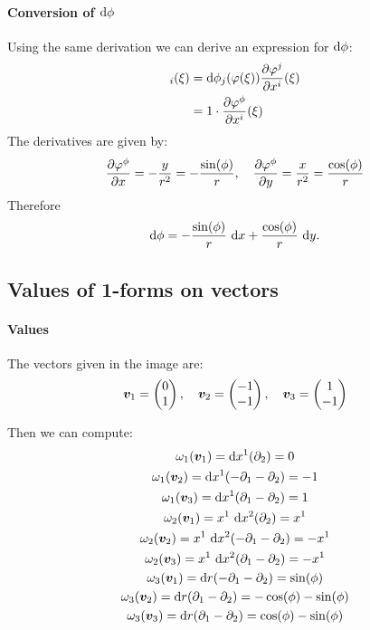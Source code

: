\documentclass[11pt, english, fleqn, DIV=15, headinclude, BCOR=1cm]{scrartcl}
\begin{document}
\paragraph{Conversion of $\mathop{}\!\mathrm d \phi$}

Using the same derivation we can derive an expression for $\mathop{}\!\mathrm d \phi$:
\begin{align*}
    [\varphi^* \dif \phi]_i(\xi)
    &= \dif \phi_j(\varphi(\xi)) \pd{\varphi^j}{x^i}(\xi) \\
    &= 1 \cdot \pd{\varphi^\phi}{x^i}(\xi)
\end{align*}
The derivatives are given by:
\[
    \frac{\partial {\varphi^\phi}}{\partial {x}} = - \frac{y}{r^2} = - \frac{\sin(\phi)}r
    ,\quad
    \frac{\partial {\varphi^\phi}}{\partial {y}} = \frac{x}{r^2} = \frac{\cos(\phi)}r
\]
Therefore
\[
    \mathop{}\!\mathrm d \phi = - \frac{\sin(\phi)}r \, \mathop{}\!\mathrm d x + \frac{\cos(\phi)}r \, \mathop{}\!\mathrm d y.
\]

\subsection{Values of 1-forms on vectors}

\paragraph{Values}

The vectors given in the image are:
\[
    \boldsymbol{v}_1 = \begin{pmatrix} 0 \\ 1 \end{pmatrix}
    ,\quad
    \boldsymbol{v}_2 = \begin{pmatrix} -1 \\ -1 \end{pmatrix}
    ,\quad
    \boldsymbol{v}_3 = \begin{pmatrix} 1 \\ -1 \end{pmatrix}
\]

Then we can compute:
\begin{gather*}
    \omega_1(\vec v_1) = \dif x^1 (\partial_2) = 0 \\
    \omega_1(\vec v_2) = \dif x^1 (-\partial_1-\partial_2) = -1 \\
    \omega_1(\vec v_3) = \dif x^1 (\partial_1-\partial_2) = 1 \\
    \omega_2(\vec v_1) = x^1 \, \dif x^2 (\partial_2) = x^1 \\
    \omega_2(\vec v_2) = x^1 \, \dif x^2 (-\partial_1-\partial_2) = -x^1 \\
    \omega_2(\vec v_3) = x^1 \, \dif x^2 (\partial_1-\partial_2) = - x^1  \\
    \omega_3(\vec v_1) = \dif r (-\partial_1-\partial_2) = \sin(\phi) \\
    \omega_3(\vec v_2) = \dif r (\partial_1-\partial_2) = -\cos(\phi) - \sin(\phi) \\
    \omega_3(\vec v_3) = \dif r (\partial_1-\partial_2) = \cos(\phi) - \sin(\phi)
\end{gather*}
\end{document}
